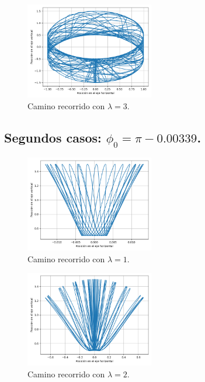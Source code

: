 \documentclass[letter, 11pt]{article}
\begin{document}
\begin{figure}[h!]
 \centering
 \includegraphics[width=0.5\textwidth]{./imagenes/img3.png}
 \caption{Camino recorrido con $\lambda = 3$.}
\end{figure}



\newpage


\subsection{Segundos casos: $\phi_0 = \pi - 0.00339$.}

\begin{figure}[h!]
 \centering
 \includegraphics[width=0.5\textwidth]{./imagenes/img4.png}
 \caption{Camino recorrido con $\lambda = 1$.}
\end{figure}

\begin{figure}[h!]
 \centering
 \includegraphics[width=0.5\textwidth]{./imagenes/img5.png}
 \caption{Camino recorrido con $\lambda = 2$.}
\end{figure}
\end{document}
